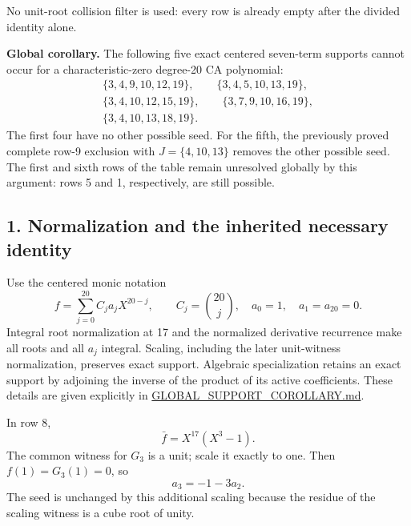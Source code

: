 \documentclass[
  british,
  10pt,
]{article}
\begin{document}
No unit-root collision filter is used: every row is already empty after
the divided identity alone.

\textbf{Global corollary.} The following five exact centered seven-term
supports cannot occur for a characteristic-zero degree-20 CA polynomial:
\[
\begin{gathered}
\{3,4,9,10,12,19\},\qquad
\{3,4,5,10,13,19\},\\
\{3,4,10,12,15,19\},\qquad
\{3,7,9,10,16,19\},\\
\{3,4,10,13,18,19\}.
\end{gathered}
\] The first four have no other possible seed. For the fifth, the
previously proved complete row-9 exclusion with \(J=\{4,10,13\}\)
removes the other possible seed. The first and sixth rows of the table
remain unresolved globally by this argument: rows 5 and 1, respectively,
are still possible.

\subsection{1. Normalization and the inherited necessary
identity}\label{normalization-and-the-inherited-necessary-identity}

Use the centered monic notation \[
f=\sum_{j=0}^{20} C_ja_jX^{20-j},\qquad
C_j=\binom{20}{j},\quad a_0=1,\quad a_1=a_{20}=0.
\] Integral root normalization at 17 and the normalized derivative
recurrence make all roots and all \(a_j\) integral. Scaling, including
the later unit-witness normalization, preserves exact support. Algebraic
specialization retains an exact support by adjoining the inverse of the
product of its active coefficients. These details are given explicitly
in
\href{new-results/GLOBAL_SUPPORT_COROLLARY.md}{GLOBAL\_SUPPORT\_COROLLARY.md}.

In row 8, \[
\bar f=X^{17}(X^3-1).
\] The common witness for \(G_3\) is a unit; scale it exactly to one.
Then \(f(1)=G_3(1)=0\), so \[
a_3=-1-3a_2.
\tag{1}
\] The seed is unchanged by this additional scaling because the residue
of the scaling witness is a cube root of unity.
\end{document}
